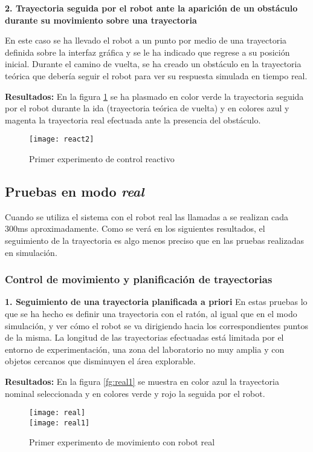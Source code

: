 \noindent
\textbf{\textbf{2.} Trayectoria seguida por el robot ante la aparición de un obstáculo durante su movimiento sobre una trayectoria}

En este caso se ha llevado el robot a un punto por medio de una trayectoria definida sobre la interfaz gráfica y se le ha indicado que regrese a su posición inicial. Durante el camino de vuelta, se ha creado un obstáculo en la trayectoria teórica que debería seguir el robot para ver su respuesta simulada en tiempo real.

\textbf{Resultados:}
En la figura \ref{fg:react3} se ha plasmado en color verde la trayectoria seguida por el robot durante la ida (trayectoria teórica de vuelta) y en colores azul y magenta la trayectoria real efectuada ante la presencia del obstáculo.
\begin{figure}[h]
  \centering\texttt{[image: react2]}\\
  \caption{Primer experimento de control reactivo}\label{fg:react3}
\end{figure} 


\subsection{Pruebas en modo \emph{real}}
Cuando se utiliza el sistema con el robot real las llamadas a  se realizan cada 300ms aproximadamente. Como se verá en los siguientes resultados, el seguimiento de la trayectoria es algo menos preciso que en las pruebas realizadas en simulación.

\subsubsection{Control de movimiento y planificación de trayectorias}

\noindent
\textbf{\textbf{1.} Seguimiento de una trayectoria planificada a priori}
En estas pruebas lo que se ha hecho es definir una trayectoria con el ratón, al igual que en el modo simulación, y ver cómo el robot se va dirigiendo hacia los correspondientes puntos de la misma. La longitud de las trayectorias efectuadas está limitada por el entorno de experimentación, una zona del laboratorio no muy amplia y con objetos cercanos que disminuyen el área explorable.

\textbf{Resultados:}
En la figura \ref{fg:real1} se muestra en color azul la trayectoria nominal seleccionada y en colores verde y rojo la seguida por el robot.
\begin{figure}[h]
  \centering\texttt{[image: real]}\\
  \hspace{0.5cm}\texttt{[image: real1]}
  \caption{Primer experimento de movimiento con robot real}\label{fg:real}
\end{figure}

